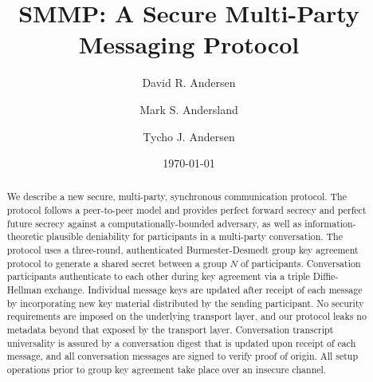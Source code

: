 \documentclass[%
preprint,
amsmath,amssymb,
aps,
prb,
floatfix,
]{revtex4-1}
\begin{document}

\title{SMMP: A Secure Multi-Party Messaging Protocol}%

\author{David R. Andersen}
\author{Mark S. Andersland}
\author{Tycho J. Andersen}

\date{\today}%

\begin{abstract}
We describe a new secure, multi-party, synchronous communication protocol.
The protocol follows a peer-to-peer model and provides perfect forward
secrecy and perfect future secrecy against a computationally-bounded adversary,
as well as information-theoretic plausible deniability for participants in
a multi-party conversation.
The protocol uses a three-round, authenticated Burmester-Desmedt group key agreement
protocol to generate a shared secret between a group $N$ of participants.
Conversation participants authenticate to each other
during key agreement via a triple Diffie-Hellman exchange.
Individual message keys are updated after receipt of each message by incorporating
new key material distributed by the sending participant.
No security requirements are imposed on the underlying transport layer, and
our protocol leaks no metadata beyond that exposed by the transport layer.
Conversation transcript universality is assured by a conversation digest that is updated
upon receipt of each message, and all conversation messages are signed to
verify proof of origin.
All setup operations prior to group key agreement take place over an insecure
channel.
\end{abstract}

\maketitle
\end{document}
